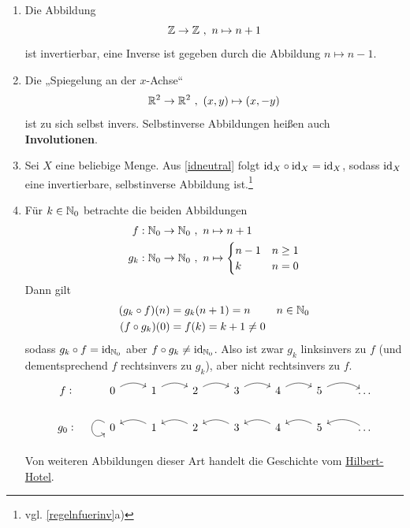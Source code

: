 \begin{bsp} \label{bsp:umkehrabb} \qquad
    \begin{enumerate}
        \item Die Abbildung
            \[ \mathbb Z\to \mathbb Z \ ,\ n\mapsto n+1 \]
        ist invertierbar, eine Inverse ist gegeben durch die Abbildung $n\mapsto n-1$.
        \item Die „Spiegelung an der $x$-Achse“
        \[ \mathbb R^2 \to \mathbb R^2 \ ,\ (x,y) \mapsto (x,-y) \]
        ist zu sich selbst invers. Selbstinverse Abbildungen heißen auch \textbf{Involutionen}.
        \item Sei $X$ eine beliebige Menge. Aus \cref{idneutral} folgt $\mathrm{id}_X\circ \mathrm{id}_X=\mathrm{id}_X$, sodass $\mathrm{id}_X$ eine invertierbare, selbstinverse Abbildung ist.\footnote{vgl. \cref{regelnfuerinv}a)}
        \item Für $k\in \mathbb N_0$ betrachte die beiden Abbildungen
        \begin{align*}
            f:\mathbb N_0 \to \mathbb N_0 \ &,\ n \mapsto n+1 \\
            g_k: \mathbb N_0 \to \mathbb N_0\ &,\ n \mapsto \begin{cases}
                n-1 & n\ge 1 \\
                k & n=0
            \end{cases}
        \end{align*}
        Dann gilt
        \begin{align*}
            (g_k\circ f)(n)&=g_k(n+1)=n && n\in \mathbb N_0 \\
            (f\circ g_k)(0) & = f(k) = k+1 \neq 0
        \end{align*}
        sodass $g_k\circ f=\mathrm{id}_{\mathbb N_0}$ aber $f\circ g_k\neq \mathrm{id}_{\mathbb N_0}$. Also ist zwar $g_k$ linksinvers zu $f$ (und dementsprechend $f$ rechtsinvers zu $g_k$), aber nicht rechtsinvers zu $f$.
        \[\begin{tikzcd}
            f\vcentcolon & 0 \ar[r, bend left]& 1 \ar[r, bend left]& 2 \ar[r, bend left]& 3 \ar[r, bend left]& 4 \ar[r, bend left]& 5 \ar[r, bend left]& \dots \\
            g_0\vcentcolon & 0 \ar[loop, out=145, in=215, looseness=5] & 1 \ar[l, bend right] & 2 \ar[l, bend right] & 3 \ar[l, bend right] & 4  \ar[l, bend right] & 5  \ar[l, bend right] &  \ar[l, bend right]  \dots
        \end{tikzcd}\]
        Von weiteren Abbildungen dieser Art handelt die Geschichte vom \href{https://en.wikipedia.org/wiki/Hilbert\%27s_paradox_of_the_Grand_Hotel}{Hilbert-Hotel}.
    \end{enumerate}
\end{bsp}


